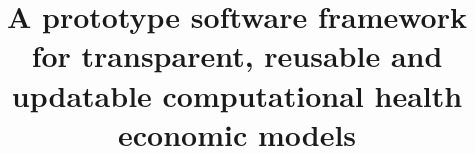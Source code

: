 \documentclass[sn-vancouver,Numbered,pdflatex]{sn-jnl}
\theoremstyle{remark}
\theoremstyle{definition}
\begin{document}
\title[Transparent, reusable and updatable computational models]{A prototype software framework for transparent, reusable and updatable computational health economic models}


\author*[1,2]{      }

\author[2]{  }



\end{document}
